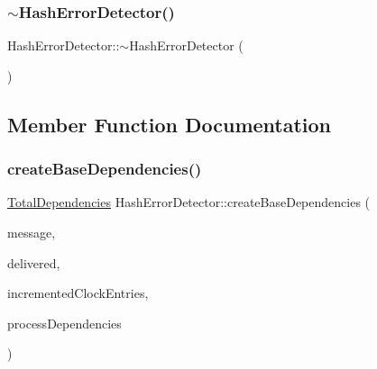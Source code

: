 \mbox{\label{classHashErrorDetector_a187ba4d9f902ecaa0ff8b92ec531d3f4}} 
\subsubsection{\texorpdfstring{$\sim$\+Hash\+Error\+Detector()}{~HashErrorDetector()}}
{\footnotesize\ttfamily Hash\+Error\+Detector\+::$\sim$\+Hash\+Error\+Detector (\begin{DoxyParamCaption}{ }\end{DoxyParamCaption})\hspace{0.3cm}{\ttfamily [virtual]}}



\subsection{Member Function Documentation}
\mbox{\label{classHashErrorDetector_a09b0d73b3a717ddf850fe644848c15c6}} 
\subsubsection{\texorpdfstring{create\+Base\+Dependencies()}{createBaseDependencies()}}
{\footnotesize\ttfamily \hyperlink{classTotalDependencies}{Total\+Dependencies} Hash\+Error\+Detector\+::create\+Base\+Dependencies (\begin{DoxyParamCaption}\item[{const \hyperlink{structures_8h_a7e7bdc1d2fff8a9436f2f352b2711ed6}{message\+Info} \&}]{message,  }\item[{const vector$<$ \hyperlink{structures_8h_a7e7bdc1d2fff8a9436f2f352b2711ed6}{message\+Info} $>$ \&}]{delivered,  }\item[{const vector$<$ unsigned int $>$ \&}]{incremented\+Clock\+Entries,  }\item[{const \hyperlink{classTotalDependencies}{Total\+Dependencies} \&}]{process\+Dependencies }\end{DoxyParamCaption})}

